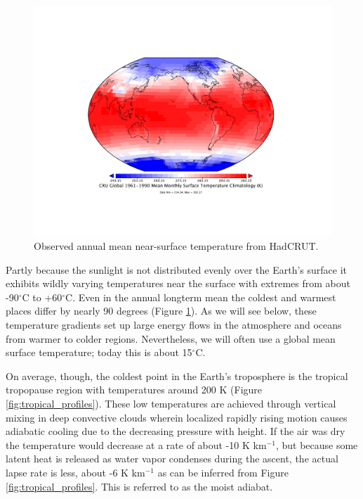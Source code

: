 \documentclass[12pt]{book}
\begin{document}
\begin{figure}
\begin{center}
\includegraphics[width=12 cm]{../external_figures/HadCRUT_absolute_timmean.pdf}
\end{center}
\caption{ Observed annual mean near-surface temperature from HadCRUT. } 
\label{fig:HadCRUT_temperature_map}
\end{figure}

Partly because the sunlight is not distributed evenly over the Earth's surface it exhibits wildly varying temperatures near the surface with extremes from about -90$^\circ$C to +60$^\circ$C. Even in the annual longterm mean the coldest and warmest places differ by nearly 90 degrees (Figure \ref{fig:HadCRUT_temperature_map}). As we will see below, these temperature gradients set up large energy flows in the atmosphere and oceans from warmer to colder regions. Nevertheless, we will often use a global mean surface temperature; today this is about 15$^\circ$C.

On average, though, the coldest point in the Earth's troposphere is the tropical tropopause region with temperatures around 200 K (Figure \ref{fig:tropical_profiles}). These low temperatures are achieved through vertical mixing in deep convective clouds wherein localized rapidly rising motion causes adiabatic cooling due to the decreasing pressure with height. If the air was dry the temperature would decrease at a rate of about -10 K km$^{-1}$, but because some latent heat is released as water vapor condenses during the ascent, the actual lapse rate is less, about -6 K km$^{-1}$ as can be inferred from Figure \ref{fig:tropical_profiles}. This is referred to as the moist adiabat.
\end{document}
